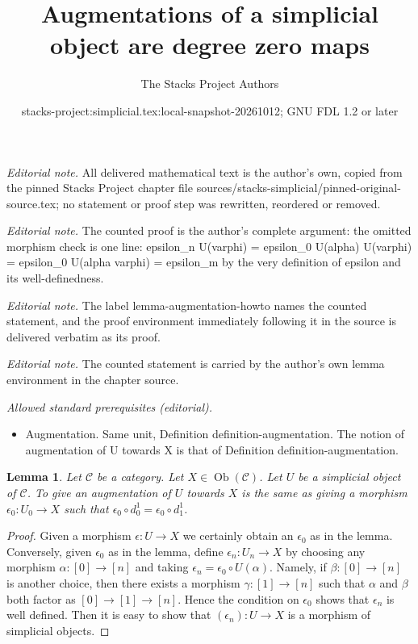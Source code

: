 \documentclass{stacks-project}
\title{Augmentations of a simplicial object are degree zero maps}
\author{The Stacks Project Authors}
\date{stacks-project:simplicial.tex:local-snapshot-20261012; GNU FDL 1.2 or later}
\theoremstyle{plain}
\newtheorem{lemma}[subsection]{Lemma}
\theoremstyle{definition}
\theoremstyle{remark}
\numberwithin{equation}{subsection}
\def\Ob{\mathop{\mathrm{Ob}}\nolimits}
\begin{document}
\maketitle
\noindent\textit{Editorial note.} All delivered mathematical text is the author's own, copied from the pinned Stacks Project chapter file sources/stacks-simplicial/pinned-original-source.tex; no statement or proof step was rewritten, reordered or removed.\par\medskip
\noindent\textit{Editorial note.} The counted proof is the author's complete argument: the omitted morphism check is one line: epsilon\_n U(varphi) = epsilon\_0 U(alpha) U(varphi) = epsilon\_0 U(alpha varphi) = epsilon\_m by the very definition of epsilon and its well-definedness.\par\medskip
\noindent\textit{Editorial note.} The label lemma-augmentation-howto names the counted statement, and the proof environment immediately following it in the source is delivered verbatim as its proof.\par\medskip
\noindent\textit{Editorial note.} The counted statement is carried by the author's own lemma environment in the chapter source.\par\medskip
\noindent\textit{Allowed standard prerequisites (editorial).}\begin{itemize}
\item Augmentation. Same unit, Definition definition-augmentation. The notion of augmentation of U towards X is that of Definition definition-augmentation.
\end{itemize}\medskip
\begin{lemma}
\label{lemma-augmentation-howto}
Let $\mathcal{C}$ be a category.
Let $X \in \Ob(\mathcal{C})$.
Let $U$ be a simplicial object of $\mathcal{C}$.
To give an augmentation of $U$ towards $X$ is
the same as giving a morphism $\epsilon_0 : U_0 \to X$
such that $\epsilon_0 \circ d^1_0 = \epsilon_0 \circ d^1_1$.
\end{lemma}

\begin{proof}
Given a morphism $\epsilon : U \to X$
we certainly obtain an $\epsilon_0$ as in the lemma.
Conversely, given $\epsilon_0$ as in the lemma, define
$\epsilon_n : U_n \to X$ by choosing any
morphism $\alpha : [0] \to [n]$ and taking
$\epsilon_n = \epsilon_0 \circ U(\alpha)$.
Namely, if $\beta : [0] \to [n]$ is another
choice, then there exists a morphism
$\gamma : [1] \to [n]$ such that $\alpha$
and $\beta$ both factor as $[0] \to [1] \to [n]$.
Hence the condition on $\epsilon_0$ shows that
$\epsilon_n$ is well defined. Then it is
easy to show that $(\epsilon_n) : U \to X$
is a morphism of simplicial objects.
\end{proof}
\end{document}

